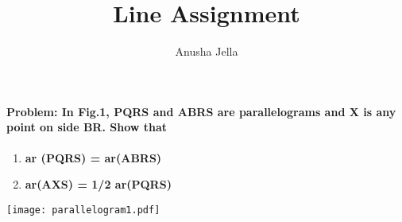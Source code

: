 \documentclass{article}
\title{Line Assignment}
\author{Anusha Jella}
\begin{document}
\maketitle
\begin{multicols}{2}
\paragraph{\textbf{Problem: } \textbf{In Fig.1, PQRS and ABRS are parallelograms
and X is any point on side BR. Show that  }}
\begin{enumerate}
    \item \textbf{ar (PQRS) = ar(ABRS)}
    \item \textbf{ar(AXS) = 1/2 ar(PQRS)}
\end{enumerate}
\centering
\texttt{[image: parallelogram1.pdf]} 
\label{fig:triangle}


\end{multicols}
\end{document}
